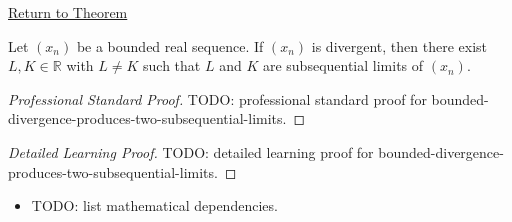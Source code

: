 \newpage
{}
\label{prf:bounded-divergence-produces-two-subsequential-limits}

\begin{remark*}[Return]
\hyperref[thm:bounded-divergence-produces-two-subsequential-limits]{Return to Theorem}
\end{remark*}

\begin{theorem*}
Let $(x_n)$ be a bounded real sequence. If $(x_n)$ is divergent, then
there exist $L,K\in\mathbb{R}$ with $L\ne K$ such that $L$ and $K$ are
subsequential limits of $(x_n)$.

\smallskip
\noindent
\end{theorem*}

\begin{proof}[Professional Standard Proof]
\LRAProofBodyStart
TODO: professional standard proof for bounded-divergence-produces-two-subsequential-limits.
\end{proof}

\begin{proof}[Detailed Learning Proof]
\LRAProofBodyStart
TODO: detailed learning proof for bounded-divergence-produces-two-subsequential-limits.
\end{proof}

\begin{remark*}
\end{remark*}

\begin{dependencies}
\begin{itemize}
  \item TODO: list mathematical dependencies.
\end{itemize}
\end{dependencies}

\clearpage
